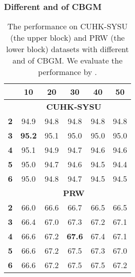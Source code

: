 \documentclass[letterpaper]{article} \usepackage{aaai21}  \usepackage{times}  \usepackage{helvet} \usepackage{courier}  \usepackage[hyphens]{url}  \usepackage{graphicx} \urlstyle{rm} \def\UrlFont{\rm}  \usepackage{natbib}  \usepackage{caption} \usepackage{multirow}
\begin{document}
\subsubsection{Different  and  of CBGM}
\begin{table}[t]
    \centering
\resizebox{0.6\columnwidth}{!}
    {
        \begin{tabular}{|c|ccccc|}
            \hline
            \diagbox{}{} & \textbf{10}                             & \textbf{20} & \textbf{30}   & \textbf{40} & \textbf{50} \\ \hline \hline
            \multicolumn{1}{|c}{}                            & \multicolumn{5}{c|}{\textbf{CUHK-SYSU}}                                                           \\ \hline
            \textbf{2}                                       & 94.9                                    & 94.8        & 94.8          & 94.8        & 94.8        \\
            \textbf{3}                                       & \textbf{95.2}                           & 95.1        & 95.0          & 95.0        & 95.0        \\
            \textbf{4}                                       & 95.1                                    & 94.9        & 94.7          & 94.6        & 94.6        \\
            \textbf{5}                                       & 95.0                                    & 94.7        & 94.6          & 94.5        & 94.4        \\
            \textbf{6}                                       & 95.0                                    & 94.8        & 94.7          & 94.5        & 94.5        \\ \hline
            \multicolumn{1}{|c}{}                            & \multicolumn{5}{c|}{\textbf{PRW}}                                                                 \\ \hline
            \textbf{2}                                       & 66.0                                    & 66.6        & 66.7          & 66.5        & 66.5        \\
            \textbf{3}                                       & 66.4                                    & 67.0        & 67.3          & 67.2        & 67.1        \\
            \textbf{4}                                       & 66.6                                    & 67.2        & \textbf{67.6} & 67.4        & 67.1        \\
            \textbf{5}                                       & 66.6                                    & 67.2        & 67.5          & 67.3        & 67.0        \\
            \textbf{6}                                       & 66.6                                    & 67.2        & 67.5          & 67.5        & 67.2        \\ \hline
        \end{tabular}
    }
    \caption{The performance on CUHK-SYSU (the upper block) and PRW (the lower block) datasets with different  and  of CBGM. We evaluate the performance by .}
    \label{k1_k2}
\end{table}
\end{document}
